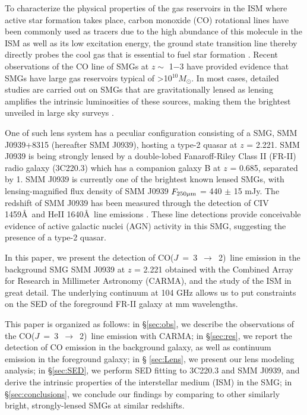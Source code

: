 \documentclass[twocolumn,apj,numberedappendix]{emulateapj}
\newcommand{\Msun}{\mbox{$M_{\odot}$}}
\newcommand{\CO}{\mbox{CO($J$ = 3 $\rightarrow$ 2) }}
\begin{document}
  To characterize the physical properties of the gas reservoirs in the ISM where active star formation takes place, carbon monoxide (CO) rotational lines have been commonly used as tracers due to the high abundance of this molecule in the ISM as well as its low excitation energy, the ground state transition line thereby directly probes the cool gas that is essential to fuel star formation \citep{Carilli13a}. Recent observations of the CO line of SMGs at $z \sim$ 1$-$3 have  
provided evidence that SMGs have large gas reservoirs typical of \textgreater 10$^{10}$\Msun. In most cases, detailed studies are carried out on SMGs that are gravitationally lensed as lensing amplifies the intrinsic luminosities of these sources, making them the brightest unveiled in large sky surveys \citep{Negrello10a,Vieira10a}. \par
One of such lens system has a peculiar configuration consisting of a SMG, SMM J0939+8315 (hereafter SMM J0939), hosting a 
type-2 quasar at $z$ = 2.221. SMM J0939 is being strongly lensed by a double-lobed Fanaroff-Riley Class II (FR-II) \citep*{Fanaroff74} radio galaxy (3C220.3) which has a 
companion galaxy B at $z$ = 0.685, separated by 1. SMM J0939 is currently one of the brightest known lensed
SMGs, with lensing-magnified flux density of SMM J0939 $F_{\rm 250\mu m}$ = 440 $\pm$ 15 mJy. The redshift of SMM J0939 has 
been measured through the detection of CIV 1459\AA\
 and HeII 1640\AA\
line emissions \citep[hereafter H14]{Haas14}. These line detections provide conceivable evidence of active galactic nuclei (AGN) activity in this SMG, suggesting the presence of a type-2 quasar. 

In this paper, we present the detection of \CO line emission in the background SMG
SMM J0939 at $z$ = 2.221 obtained with the Combined
Array for Research in Millimeter Astronomy (CARMA), and the study of the ISM in great detail. The underlying continuum at 104 GHz allows us to put constraints on the SED of the 
foreground FR-II galaxy at mm wavelengths. 

This paper is organized as follows: in \S \ref{sec:obs}, we describe the
observations of the \CO line emission with CARMA; in \S \ref{sec:res}, we report the
detection of CO emission in the background galaxy, as well as continuum emission in the foreground galaxy; in \S
\ref{sec:Lens}, we present our lens modeling analysis; in \S \ref{sec:SED}, we perform SED fitting to 3C220.3
and SMM J0939, and derive the intrinsic properties of the interstellar medium (ISM) in the SMG; in \S \ref{sec:conclusions}, we
conclude our findings by comparing to other similarly bright, strongly-lensed SMGs at similar redshifts.
\end{document}
